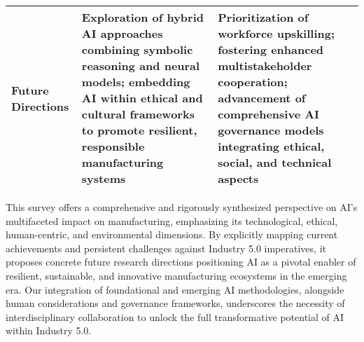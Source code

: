\documentclass[sigconf]{acmart}
\begin{document}
\begin{table*}[htbp]
\begin{adjustbox}{max width=\textwidth}
\begin{tabular}{@{}lll@{}}
Future Directions & Exploration of hybrid AI approaches combining symbolic reasoning and neural models; embedding AI within ethical and cultural frameworks to promote resilient, responsible manufacturing systems~\cite{ref35,ref37,ref25} & Prioritization of workforce upskilling; fostering enhanced multistakeholder cooperation; advancement of comprehensive AI governance models integrating ethical, social, and technical aspects~\cite{ref2,ref3,ref21} \\
\bottomrule
\end{tabular}
\end{adjustbox}
\end{table*}

This survey offers a comprehensive and rigorously synthesized perspective on AI’s multifaceted impact on manufacturing, emphasizing its technological, ethical, human-centric, and environmental dimensions. By explicitly mapping current achievements and persistent challenges against Industry 5.0 imperatives, it proposes concrete future research directions positioning AI as a pivotal enabler of resilient, sustainable, and innovative manufacturing ecosystems in the emerging era. Our integration of foundational and emerging AI methodologies, alongside human considerations and governance frameworks, underscores the necessity of interdisciplinary collaboration to unlock the full transformative potential of AI within Industry 5.0.






\end{document}
